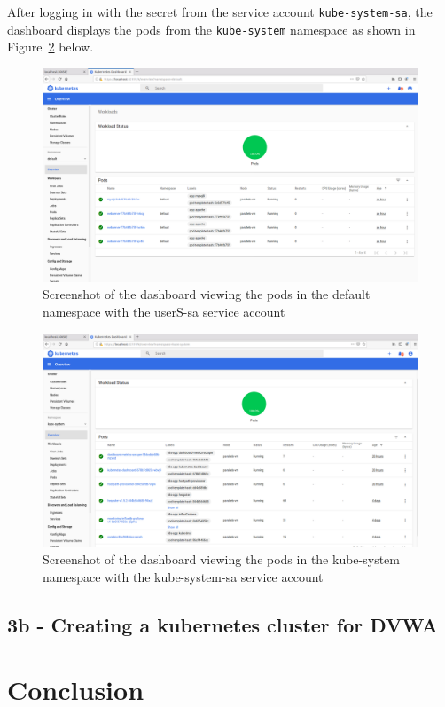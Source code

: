\documentclass[11pt]{article}
\begin{document}
After logging in with the secret from the service account \verb|kube-system-sa|,
the dashboard displays the pods from the \verb|kube-system| namespace as shown in Figure~\ref{fig:dashboard-kube} below.
\begin{figure}[htbp]
  \centering
  \includegraphics[width=.9\linewidth]{./dashboard-def.png}
  \caption{\label{fig:dashboard-def}
  Screenshot of the dashboard viewing the pods in the default namespace with the userS-sa service account}
\end{figure}
\begin{figure}[htbp]
  \centering
  \includegraphics[width=.9\linewidth]{./dashboard-kube.png}
  \caption{\label{fig:dashboard-kube}
    Screenshot of the dashboard viewing the pods in the kube-system namespace with the kube-system-sa service account}
\end{figure}

\newpage
\subsection*{3b - Creating a kubernetes cluster for DVWA}

\section*{Conclusion}
\label{sec:conclusion}


\newpage
\nocite{*}


\end{document}
